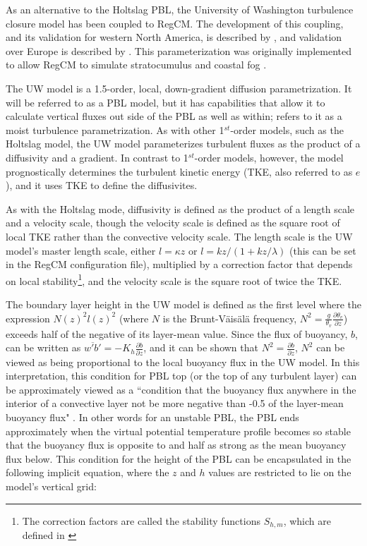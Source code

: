 As an alternative to the Holtslag PBL, the University of Washington turbulence
closure model \citep{Grenier_01,Bretherton_04} has been coupled to RegCM.  The
development of this coupling, and its validation for western North America, is
described by \cite{OBrien_12a}, and validation over Europe is described by
\cite{Guettler_13}.  This parameterization was originally implemented to allow
RegCM to simulate stratocumulus and coastal fog
\citep{OBrien_12a,OBrien_12b}.

The UW model is a 1.5-order, local, down-gradient diffusion parametrization.
It will be referred to as a PBL model, but it has capabilities that allow it to
calculate vertical fluxes out side of the PBL as well as within;
\cite{Bretherton_04} refers to it as a moist turbulence parametrization.  As
with other 1$^{st}$-order models, such as the Holtslag model, the UW model
parameterizes turbulent fluxes as the product of a diffusivity and a gradient.
In contrast to 1$^{st}$-order models, however, the model prognostically
determines the turbulent kinetic energy (TKE, also referred to as $e$), and it
uses TKE to define the diffusivites. 

As with the Holtslag mode, diffusivity is defined as the product of a length
scale and a velocity scale, though the velocity scale is defined as the square
root of local TKE rather than the convective velocity scale. The length scale
is the UW model's master length scale, either $l = \kappa z$ or $l = kz/(1 +
kz/\lambda)$ (this can be set in the RegCM configuration file), multiplied by a
correction factor that depends on local stability\footnote{The correction
  factors are called the stability functions $S_{h,m}$, which are defined in
\cite{Galperin_88}}, and the velocity scale is the square root of twice the
TKE.

The boundary layer height in the UW model is defined as the first level where
the expression $N(z)^2 l(z)^2$ (where $N$ is the Brunt-V\"{a}is\"{a}l\"{a}
frequency, $N^2 = \frac{g}{\theta_v}\frac{\partial \theta_v}{\partial z}$)
exceeds half of the negative of its layer-mean value.  Since the flux of
buoyancy, $b$, can be written as $\overline{w'b'} = -K_h \frac{\partial
b}{\partial z}$, and it can be shown that $N^2 = \frac{\partial b}{\partial
z}$, $N^2$ can be viewed as being proportional to the local buoyancy flux in
the UW model.  In this interpretation, this condition for PBL top (or the top
of any turbulent layer) can be approximately viewed as a ``condition that the
buoyancy flux anywhere in the interior of a convective layer not be more
negative than -0.5 of the layer-mean buoyancy flux" \citep{Bretherton_04}.  In
other words for an unstable PBL, the PBL ends approximately when the virtual
potential temperature profile becomes so stable that the buoyancy flux is
opposite to and half as strong as the mean buoyancy flux below.  This condition
for the height of the PBL can be encapsulated in the following implicit
equation, where the $z$ and $h$ values are restricted to lie on the model's
vertical grid:

